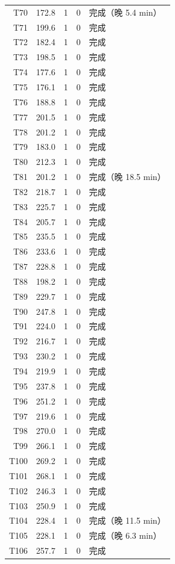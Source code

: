 \documentclass[a4paper,11pt]{article}
\begin{document}
\begin{table}[htbp]
\begin{tabular}{rcccl}
T70 & 172.8 & 1 & 0 & 完成（晚 5.4 min） \\
T71 & 199.6 & 1 & 0 & 完成 \\
T72 & 182.4 & 1 & 0 & 完成 \\
T73 & 198.5 & 1 & 0 & 完成 \\
T74 & 177.6 & 1 & 0 & 完成 \\
T75 & 176.1 & 1 & 0 & 完成 \\
T76 & 188.8 & 1 & 0 & 完成 \\
T77 & 201.5 & 1 & 0 & 完成 \\
T78 & 201.2 & 1 & 0 & 完成 \\
T79 & 183.0 & 1 & 0 & 完成 \\
T80 & 212.3 & 1 & 0 & 完成 \\
T81 & 201.2 & 1 & 0 & 完成（晚 18.5 min） \\
T82 & 218.7 & 1 & 0 & 完成 \\
T83 & 225.7 & 1 & 0 & 完成 \\
T84 & 205.7 & 1 & 0 & 完成 \\
T85 & 235.5 & 1 & 0 & 完成 \\
T86 & 233.6 & 1 & 0 & 完成 \\
T87 & 228.8 & 1 & 0 & 完成 \\
T88 & 198.2 & 1 & 0 & 完成 \\
T89 & 229.7 & 1 & 0 & 完成 \\
T90 & 247.8 & 1 & 0 & 完成 \\
T91 & 224.0 & 1 & 0 & 完成 \\
T92 & 216.7 & 1 & 0 & 完成 \\
T93 & 230.2 & 1 & 0 & 完成 \\
T94 & 219.9 & 1 & 0 & 完成 \\
T95 & 237.8 & 1 & 0 & 完成 \\
T96 & 251.2 & 1 & 0 & 完成 \\
T97 & 219.6 & 1 & 0 & 完成 \\
T98 & 270.0 & 1 & 0 & 完成 \\
T99 & 266.1 & 1 & 0 & 完成 \\
T100 & 269.2 & 1 & 0 & 完成 \\
T101 & 268.1 & 1 & 0 & 完成 \\
T102 & 246.3 & 1 & 0 & 完成 \\
T103 & 250.9 & 1 & 0 & 完成 \\
T104 & 228.4 & 1 & 0 & 完成（晚 11.5 min） \\
T105 & 228.1 & 1 & 0 & 完成（晚 6.3 min） \\
T106 & 257.7 & 1 & 0 & 完成 \\

\end{tabular}
\end{table}
\end{document}
